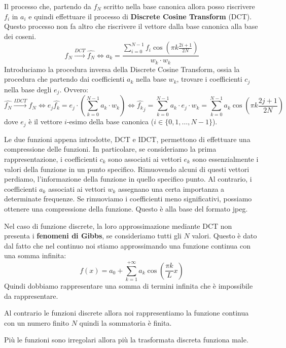 Il processo che, partendo da $f_N$ scritto nella base canonica allora posso
riscrivere $f_i$ in $a_i$ e quindi effettuare il processo di \textbf{Discrete
    Cosine Transform} (DCT). Questo processo non fa altro che riscrivere il
vettore dalla base canonica alla base dei coseni.
\begin{equation*}
    f_N \stackrel{DCT}{\to } \hat{f_N} \iff a_k = \frac{\sum_{i = 0}^{N-1}f_i\cos
        \left(\pi k \frac{2i +1}{2N}\right)}{w_k\cdot w_k}
\end{equation*}
Introduciamo la procedura inversa della Discrete Cosine Transform, ossia la
procedura che partendo dai coefficienti $a_k$ nella base $w_k$, trovare i
coefficienti $c_j$ nella base degli $e_j$. Ovvero:
\begin{equation*}
    \hat{f_N} \stackrel{IDCT}{\to} f_N \iff e_j \hat{f_k} = e_j \cdot
    \left(\sum_{k=0}^{N-1}a_k \cdot w_k\right) \iff \hat{f_k}_j = \sum_{k=0}^{N-1}
    a_k \cdot e_j \cdot w_k = \sum_{k=0}^{N-1} a_k \cos\left(\pi k \frac{2j+1}{2N}\right)
\end{equation*}
dove $e_j$ è il vettore $i$-esimo della base canonica ($i\in \{0,1,\dots, N-1\}$).

Le due funzioni appena introdotte, DCT e IDCT, permettono di effettuare una
compressione delle funzioni. In particolare, se consideriamo la prima rappresentazione,
i coefficienti $c_k$ sono associati ai vettori $e_k$ sono essenzialmente i valori
della funzione in un punto specifico. Rimuovendo alcuni di questi vettori perdiamo,
l'informazione della funzione in quello specifico punto. Al contrario, i coefficienti
$a_k$ associati ai vettori $w_k$ assegnano una certa importanza a determinate
frequenze. Se rimuoviamo i coefficienti meno significativi, possiamo ottenere una
compressione della funzione. Questo è alla base del formato jpeg.
\begin{nota}
    Nel caso di funzione discrete, la loro approssimazione mediante DCT non
    presenta i \textbf{fenomeni di Gibbs}, se consideriamo tutti gli $N$ valori.
    Questo è dato dal fatto che nel continuo noi stiamo approssimando una funzione
    continua con una somma infinita:
    \begin{equation*}
        f(x) = a_0 + \sum_{k=1}^{+\infty} a_k \cos\left(\frac{\pi k}{L}x\right)
    \end{equation*}
    Quindi dobbiamo rappresentare una somma di termini infinita che è impossibile
    da rappresentare.

    Al contrario le funzioni discrete allora noi rappresentiamo la funzione continua
    con un numero finito $N$ quindi la sommatoria è finita.
\end{nota}
\begin{nota}
    Più le funzioni sono irregolari allora più la trasformata discreta funziona
    male.
\end{nota}
